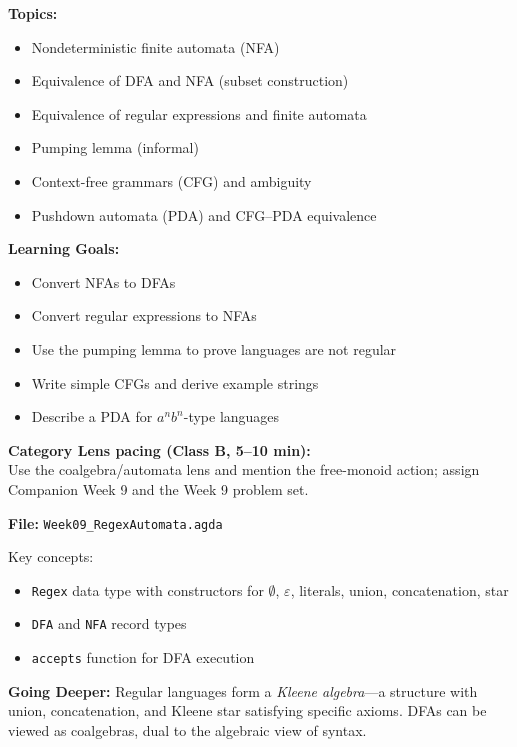 \documentclass[11pt]{article}
\begin{document}
\begin{classbbox}
\textbf{Topics:}
\begin{itemize}
    \item Nondeterministic finite automata (NFA)
    \item Equivalence of DFA and NFA (subset construction)
    \item Equivalence of regular expressions and finite automata
    \item Pumping lemma (informal)
    \item Context-free grammars (CFG) and ambiguity
    \item Pushdown automata (PDA) and CFG--PDA equivalence
\end{itemize}

\textbf{Learning Goals:}
\begin{itemize}
    \item Convert NFAs to DFAs
    \item Convert regular expressions to NFAs
    \item Use the pumping lemma to prove languages are not regular
    \item Write simple CFGs and derive example strings
    \item Describe a PDA for $a^n b^n$-type languages
\end{itemize}
\end{classbbox}

\textbf{Category Lens pacing (Class B, 5--10 min):}\\
Use the coalgebra/automata lens and mention the free-monoid action; assign Companion Week 9 and the Week 9 problem set.

\begin{agdabox}
\textbf{File:} \texttt{Week09\_RegexAutomata.agda}

Key concepts:
\begin{itemize}
    \item \texttt{Regex} data type with constructors for $\emptyset$, $\varepsilon$, literals, union, concatenation, star
    \item \texttt{DFA} and \texttt{NFA} record types
    \item \texttt{accepts} function for DFA execution
\end{itemize}

\textbf{Going Deeper:} Regular languages form a \textit{Kleene algebra}---a structure with union, concatenation, and Kleene star satisfying specific axioms. DFAs can be viewed as coalgebras, dual to the algebraic view of syntax.
\end{agdabox}
\end{document}
